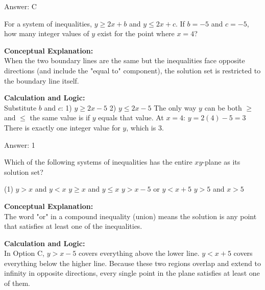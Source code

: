 \documentclass[11pt,paper=a4,answers]{exam}
\begin{document}
\begin{questions}
\begin{solution}
\vspace{15pt}
Answer: \colorbox{yellow!100}{C}
\end{solution}

\question
For a system of inequalities, $y \ge 2x + b$ and $y \le 2x + c$. If $b = -5$ and $c = -5$, how many integer values of $y$ exist for the point where $x = 4$?

\begin{solution}
\textbf{Conceptual Explanation:} \\
When the two boundary lines are the same but the inequalities face opposite directions (and include the "equal to" component), the solution set is restricted to the boundary line itself.

\vspace{10pt}
\textbf{Calculation and Logic:} \\
Substitute $b$ and $c$:
1) $y \ge 2x - 5$
2) $y \le 2x - 5$
The only way $y$ can be both $\ge$ and $\le$ the same value is if $y$ equals that value.
At $x = 4$:
$y = 2(4) - 5 = 3$
There is exactly one integer value for $y$, which is 3.

\vspace{15pt}
Answer: \colorbox{yellow!100}{1}
\end{solution}

\question
Which of the following systems of inequalities has the entire $xy$-plane as its solution set?
\begin{tasks}(1)
    \task $y > x$ and $y < x$
    \task $y \ge x$ and $y \le x$
    \task $y > x - 5$ or $y < x + 5$
    \task $y > 5$ and $x > 5$
\end{tasks}

\begin{solution}
\textbf{Conceptual Explanation:} \\
The word "or" in a compound inequality (union) means the solution is any point that satisfies at least one of the inequalities.

\vspace{10pt}
\textbf{Calculation and Logic:} \\
In Option C, $y > x - 5$ covers everything above the lower line. $y < x + 5$ covers everything below the higher line. Because these two regions overlap and extend to infinity in opposite directions, every single point in the plane satisfies at least one of them.


\end{solution}
\end{questions}
\end{document}
